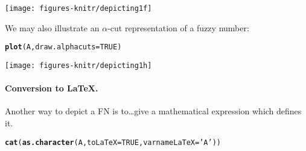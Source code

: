 \documentclass[11pt]{article}\usepackage{graphicx, color}
\makeatletter
\newcommand{\hlfunctioncall}[1]{\textcolor[rgb]{0.501960784313725,0,0.329411764705882}{\textbf{#1}}}%
\newcommand{\hlstring}[1]{\textcolor[rgb]{0.6,0.6,1}{#1}}%
\newenvironment{kframe}{%
 \def\at@end@of@kframe{}%
 \ifinner\ifhmode%
  \def\at@end@of@kframe{\end{minipage}}%
  \begin{minipage}{\columnwidth}%
 \fi\fi%
 \def\FrameCommand##1{\hskip\@totalleftmargin \hskip-\fboxsep
 \colorbox{shadecolor}{##1}\hskip-\fboxsep
     \hskip-\linewidth \hskip-\@totalleftmargin \hskip\columnwidth}%
 \MakeFramed {\advance\hsize-\width
   \@totalleftmargin\z@ \linewidth\hsize
   \@setminipage}}%
 {\par\unskip\endMakeFramed%
 \at@end@of@kframe}
\newenvironment{knitrout}{}{} %
\makeatother
\begin{document}
\begin{center}
\begin{knitrout}\small
{}\color{fgcolor}

{\centering \texttt{[image: figures-knitr/depicting1f]} 

}



\end{knitrout}

\end{center}

\bigskip
We may also illustrate an $\alpha$-cut representation of a fuzzy number:

\begin{knitrout}\small
{}\color{fgcolor}\begin{kframe}
\begin{alltt}
\hlfunctioncall{plot}(A, draw.alphacuts=TRUE)
\end{alltt}
\end{kframe}
\end{knitrout}


\begin{center}
\begin{knitrout}\small
{}\color{fgcolor}

{\centering \texttt{[image: figures-knitr/depicting1h]} 

}



\end{knitrout}

\end{center}


\paragraph{Conversion to \LaTeX.}
Another way to depict a FN is to\dots give a mathematical expression
which defines it.

\begin{knitrout}\small
{}\color{fgcolor}\begin{kframe}
\begin{alltt}
\hlfunctioncall{cat}(\hlfunctioncall{as.character}(A, toLaTeX=TRUE, varnameLaTeX=\hlstring{'A'}))
\end{alltt}
\end{kframe}
\end{knitrout}
\end{document}
